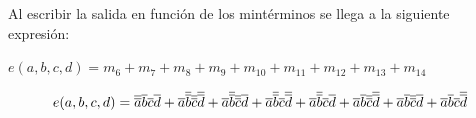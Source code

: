 \newline Al escribir la salida en función de los mintérminos se llega a la siguiente expresión:
\newline \centerline{$e(a,b,c,d)=m_{6}+m_{7}+m_{8}+m_{9}+m_{10}+m_{11}+m_{12}+m_{13}+m_{14}$}
\begin{equation}
	\centerline{$e(a,b,c,d)=\overline{\overline{a}}\overline{b}\overline{c}\overline{d}+\overline{a}\overline{\overline{b}}\overline{\overline{c}}\overline{\overline{d}}+\overline{a}\overline{\overline{b}}\overline{\overline{c}}\overline{d}+\overline{a}\overline{\overline{b}}\overline{c}\overline{\overline{d}}+\overline{a}\overline{\overline{b}}\overline{c}\overline{d}+\overline{a}\overline{b}\overline{\overline{c}}\overline{\overline{d}}+\overline{a}\overline{b}\overline{\overline{c}}\overline{d}+\overline{a}\overline{b}\overline{c}\overline{\overline{d}}$}
\end{equation}

